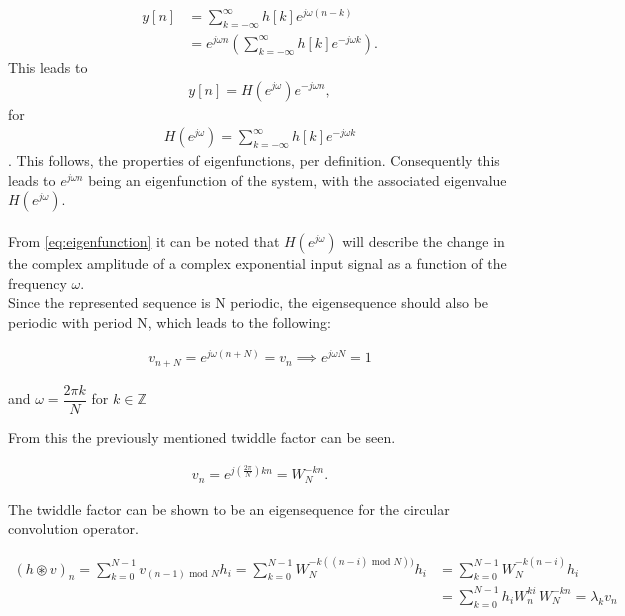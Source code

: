 \begin{align*}
y[n] 
&= \sum_{k=-\infty}^{\infty} h[k]e^{j\omega(n-k)} \nonumber \\ 
&= e^{j\omega n} \left(\sum_{k=-\infty}^{\infty} h[k]e^{-j\omega k} \right).
\end{align*}
This leads to
\begin{align}\label{eq:eigenfunction}
y[n] = H(e^{j \omega}) e^{-j\omega n},
\end{align}
for
\begin{align*}
H(e^{j\omega}) = \sum_{k=-\infty}^{\infty} h[k]e^{-j\omega k} 
\end{align*}.
This follows, the properties of eigenfunctions, per definition.
Consequently this leads to $e^{j\omega n}$ being an eigenfunction of the system, with the associated eigenvalue $H(e^{j\omega})$.
\\\\
From \eqref{eq:eigenfunction} it can be noted that $H(e^{j\omega})$ will describe the change in the complex amplitude of a complex exponential input signal as a function of the frequency $\omega$. \cite{DTSP} 
\\
Since the represented sequence is N periodic, the eigensequence should also be periodic with period N, which leads to the following:

\begin{align*}
	v_{n+N} = e^{j\omega (n+N)} = v_n \implies e^{j\omega N} = 1
\end{align*}

and $\omega = \dfrac{2 \pi k}{N}$ for $k \in \mathbb{Z}$

From this the previously mentioned twiddle factor can be seen.

\begin{align*}
	v_n = e^{j(\frac{2\pi}{N}) kn} = W_N^{-kn}.
\end{align*}\cite{FSP}

The twiddle factor can be shown to be an eigensequence for the circular convolution operator.

\begin{align*}
	(h\circledast v)_n 
	= \sum_{k=0}^{N-1} v_{(n-1)\text{ mod }N}h_i 
	= \sum_{k=0}^{N-1} W_N^{-k((n-i) \text{ mod } N))}h_i
	&= \sum_{k=0}^{N-1} W_N^{-k(n-i)}h_i\\
	&= \sum_{k=0}^{N-1} h_i W_n^{ki} \, W_N^{-kn}
	= \lambda_k v_n
\end{align*}

